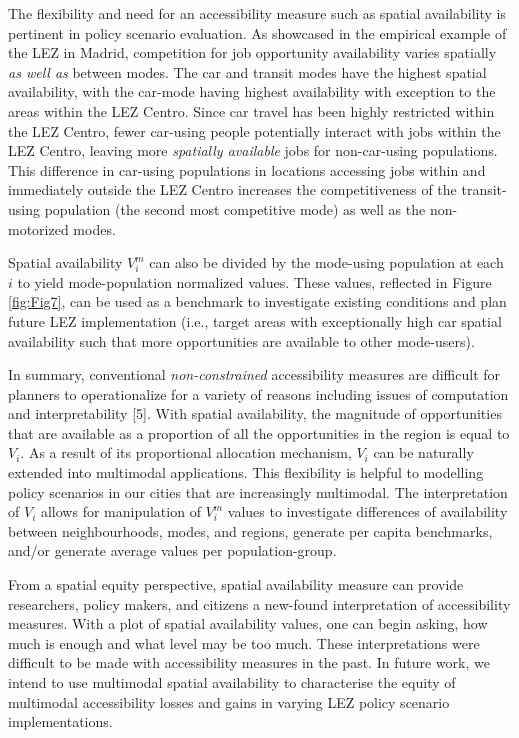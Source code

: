 \documentclass[10pt,letterpaper]{article}
\begin{document}
The flexibility and need for an accessibility measure such as spatial
availability is pertinent in policy scenario evaluation. As showcased in
the empirical example of the LEZ in Madrid, competition for job
opportunity availability varies spatially \emph{as well as} between
modes. The car and transit modes have the highest spatial availability,
with the car-mode having highest availability with exception to the
areas within the LEZ Centro. Since car travel has been highly restricted
within the LEZ Centro, fewer car-using people potentially interact with
jobs within the LEZ Centro, leaving more \emph{spatially available} jobs
for non-car-using populations. This difference in car-using populations
in locations accessing jobs within and immediately outside the LEZ
Centro increases the competitiveness of the transit-using population
(the second most competitive mode) as well as the non-motorized modes.

Spatial availability \(V_i^m\) can also be divided by the mode-using
population at each \(i\) to yield mode-population normalized values.
These values, reflected in Figure \ref{fig:Fig7}, can be used as a
benchmark to investigate existing conditions and plan future LEZ
implementation (i.e., target areas with exceptionally high car spatial
availability such that more opportunities are available to other
mode-users).

In summary, conventional \emph{non-constrained} accessibility measures
are difficult for planners to operationalize for a variety of reasons
including issues of computation and interpretability {[}5{]}. With
spatial availability, the magnitude of opportunities that are available
as a proportion of all the opportunities in the region is equal to
\(V_i\). As a result of its proportional allocation mechanism, \(V_i\)
can be naturally extended into multimodal applications. This flexibility
is helpful to modelling policy scenarios in our cities that are
increasingly multimodal. The interpretation of \(V_i\) allows for
manipulation of \(V_i^m\) values to investigate differences of
availability between neighbourhoods, modes, and regions, generate per
capita benchmarks, and/or generate average values per population-group.

From a spatial equity perspective, spatial availability measure can
provide researchers, policy makers, and citizens a new-found
interpretation of accessibility measures. With a plot of spatial
availability values, one can begin asking, how much is enough and what
level may be too much. These interpretations were difficult to be made
with accessibility measures in the past. In future work, we intend to
use multimodal spatial availability to characterise the equity of
multimodal accessibility losses and gains in varying LEZ policy scenario
implementations.
\end{document}

